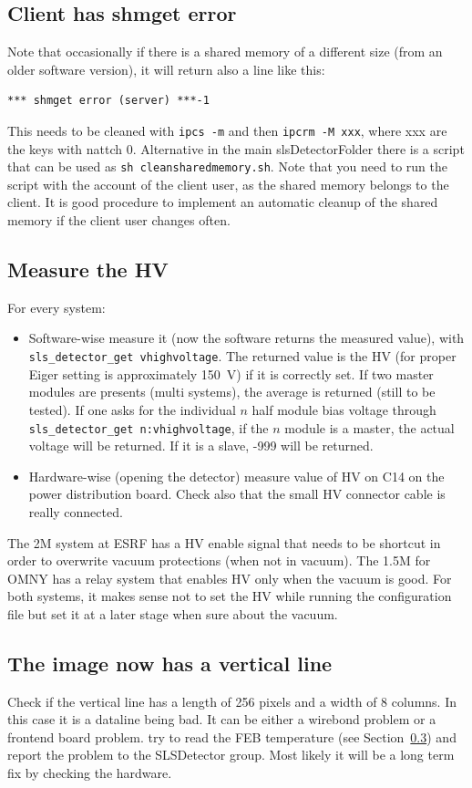 \documentclass{article}
\begin{document}
\subsection{Client has \textbf{shmget error}}
Note that occasionally if there is a shared memory of a different size (from an older software version), it will return also a line like this:
\begin{verbatim}
*** shmget error (server) ***-1
\end{verbatim}
This needs to be cleaned with {\tt{ipcs -m}} and then {\tt{ipcrm -M xxx}}, where xxx are the keys with nattch 0. Alternative in the main slsDetectorFolder there is a script that can be used as {\tt{sh cleansharedmemory.sh}}. Note that you need to run the script with the account of the client user, as the shared memory belongs to the client. It is good procedure to implement an automatic cleanup of the shared memory if the client user changes often.   

\subsection{Measure the HV}
For every system: 
\begin{itemize}
\item Software-wise measure it (now the software returns the measured value), with {\tt{sls\_detector\_get vhighvoltage}}. The returned value is the HV (for proper Eiger setting is approximately 150~V) if it is correctly set. If two master modules are presents (multi systems), the average is returned (still to be tested). If one asks for the individual $n$ half module bias voltage through {\tt{sls\_detector\_get n:vhighvoltage}}, if the $n$ module is a master, the actual voltage will be returned. If it is a slave, -999 will be returned. 
\item Hardware-wise (opening the detector) measure value of HV on C14 on the power distribution board. Check also that the small HV connector cable is really connected. 
 \end{itemize}

The 2M system at ESRF has a HV enable signal that needs to be shortcut in order to overwrite vacuum protections (when not in vacuum). 
The 1.5M for OMNY has a relay system that enables HV only when the vacuum is good. 
For both systems, it makes sense not to set the HV while running the configuration file but set it at a later stage when sure about the vacuum. 

\subsection{The image now has a vertical line}
Check if the vertical line has a length of 256 pixels and a width of 8 columns. In this case it is a dataline being bad. It can be either a wirebond problem or a frontend board problem. try to read the FEB temperature (see Section~\ref{}) and report the problem to the SLSDetector group. Most likely it will be a long term fix by checking the hardware.
\end{document}
